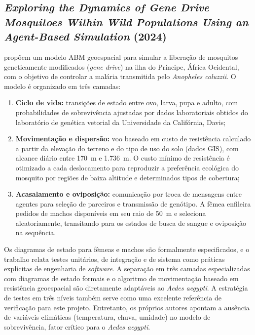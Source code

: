 \begin{apendicesenv}
\subsection{\textit{Exploring the Dynamics of Gene Drive Mosquitoes Within Wild
Populations Using an Agent-Based Simulation} (2024)}
\label{ap:wickramasooriya2024}

 propõem um modelo ABM geoespacial para simular
a liberação de mosquitos geneticamente modificados (\textit{gene drive}) na ilha do
Príncipe, África Ocidental, com o objetivo de controlar a malária transmitida pelo
\textit{Anopheles coluzzii}. O modelo é organizado em três camadas:

\begin{enumerate}[label=(\alph*)]
    \item \textbf{Ciclo de vida:} transições de estado entre ovo, larva, pupa e adulto,
    com probabilidades de sobrevivência ajustadas por dados laboratoriais obtidos do
    laboratório de genética vetorial da Universidade da Califórnia, Davis;
    \item \textbf{Movimentação e dispersão:} voo baseado em custo de resistência
    calculado a partir da elevação do terreno e do tipo de uso do solo (dados GIS),
    com alcance diário entre 170~m e 1.736~m. O custo mínimo de resistência é otimizado a cada deslocamento para reproduzir a preferência
    ecológica do mosquito por regiões de baixa altitude e determinados tipos de
    cobertura;
    \item \textbf{Acasalamento e oviposição:} comunicação por troca de mensagens
    entre agentes para seleção de parceiros e transmissão de genótipo. A fêmea
    enfileira pedidos de machos disponíveis em seu raio de 50~m e seleciona
    aleatoriamente, transitando para os estados de busca de sangue e oviposição
    na sequência.
\end{enumerate}

Os diagramas de estado para fêmeas e machos são formalmente especificados,
e o trabalho relata testes unitários, de integração e de sistema como práticas
explícitas de engenharia de \textit{software}. A separação em três camadas
especializadas com diagramas de estado formais e o algoritmo de movimentação
baseado em resistência geoespacial são diretamente adaptáveis ao
\textit{Aedes aegypti}. A estratégia de testes em três níveis também serve como
uma excelente referência de verificação para este projeto. Entretanto, os próprios autores apontam a ausência de variáveis climáticas
(temperatura, chuva, umidade) no modelo de sobrevivência, fator crítico para o
\textit{Aedes aegypti}.


\end{apendicesenv}
